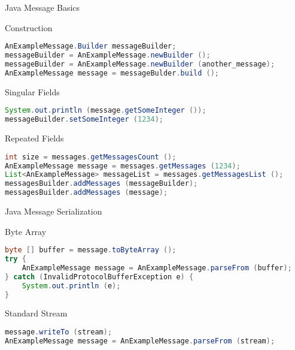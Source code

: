 \begin{frame}[fragile]{Java Message Basics}
    \begin{block}{Construction}
\begin{lstlisting}[language=java,style=mini]
AnExampleMessage.Builder messageBuilder;
messageBuilder = AnExampleMessage.newBuilder ();
messageBuilder = AnExampleMessage.newBuilder (another_message);
AnExampleMessage message = messageBulder.build ();
\end{lstlisting}
    \end{block}
    \begin{block}{Singular Fields}
\begin{lstlisting}[language=java,style=mini]
System.out.println (message.getSomeInteger ());
messageBuilder.setSomeInteger (1234);
\end{lstlisting}
    \end{block}
    \begin{block}{Repeated Fields}
\begin{lstlisting}[language=java,style=mini]
int size = messages.getMessagesCount ();
AnExampleMessage message = messages.getMessages (1234);
List<AnExampleMessage> messageList = messages.getMessagesList ();
messagesBuilder.addMessages (messageBuilder);
messagesBuilder.addMessages (message);
\end{lstlisting}
    \end{block}
\end{frame}


\begin{frame}[fragile]{Java Message Serialization}
    \begin{block}{Byte Array}
\begin{lstlisting}[language=java,style=mini]
byte [] buffer = message.toByteArray ();
try {
    AnExampleMessage message = AnExampleMessage.parseFrom (buffer);
} catch (InvalidProtocolBufferException e) {
    System.out.println (e);
}
\end{lstlisting}
    \end{block}

    \bigskip

    \begin{block}{Standard Stream}
\begin{lstlisting}[language=java,style=mini]
message.writeTo (stream);
AnExampleMessage message = AnExampleMessage.parseFrom (stream);
\end{lstlisting}
    \end{block}
\end{frame}



